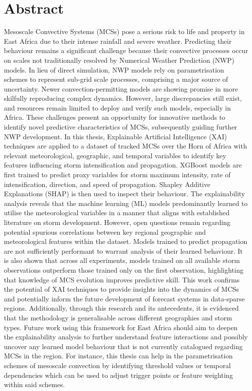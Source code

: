 \section*{\center \Large  Abstract}

\noindent
Mesoscale Convective Systems (MCSs) pose a serious risk to life and property in East Africa due to their intense rainfall and severe weather. Predicting their behaviour remains a significant challenge because their convective processes occur on scales not traditionally resolved by Numerical Weather Prediction (NWP) models. In lieu of direct simulation, NWP models rely on parametrisation schemes to represent sub-grid scale processes, comprising a major source of uncertainty. Newer convection-permitting models are showing promise in more skilfully reproducing complex dynamics. However, large discrepancies still exist, and resources remain limited to deploy and verify such models, especially in Africa. These challenges present an opportunity for innovative methods to identify novel predictive characteristics of MCSs, subsequently guiding further NWP development. In this thesis, Explainable Artificial Intelligence (XAI) techniques are applied to a dataset of tracked MCSs over the Horn of Africa with relevant meteorological, geographic, and temporal variables to identify key features influencing storm intensification and propagation. XGBoost models are first trained to predict proxy variables for storm maximum intensity, rate of intensification, direction, and speed of propagation. Shapley Additive Explanations (SHAP) is then used to inspect their behaviour. The explainability analysis reveals that the machine learning (ML) models predominantly learned to utilise the meteorological variables in a manner that aligns with established literature on storm development. However, open questions remain regarding potential spurious correlations between key regional geographic and meteorological features within the dataset. Models trained to predict propagation are not sufficiently performant to warrant analysis of their learned behaviour. It is also shown that across all experiments, models trained on all available storm observations outperform those trained only on the first observation, highlighting that knowledge of MCS evolution improves predictive skill. This work confirms the potential of XAI techniques to provide insights into the dynamics of MCSs and potentially inform the future development of forecast systems in data-sparse regions. Additionally, through this research and its antecedents, it is evidenced that the methodology is generalisable across different geographies and storm types. Future work using this framework for East Africa should aim to deepen the explainability analysis to further understand feature interactions and possibly uncover any learned model behaviour that is not currently catalogued regarding MCSs in the region. For instance, this thesis can help in the parametrisation schemes of mesoscale convection by identifying threshold values or temporal dependencies which can be used to adjust trigger points or feature weighting within said schemes.

